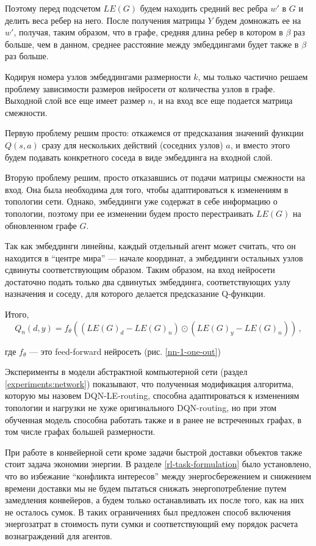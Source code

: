 \documentclass[specification,annotation,times]{itmo-student-thesis}
\theoremstyle{definition}
\begin{document}
Поэтому перед подсчетом $LE(G)$ будем находить
средний вес ребра $w'$ в $G$ и делить веса ребер на него. После получения
матрицы $Y$ будем домножать ее на $w'$, получая, таким образом, что в графе,
средняя длина ребер в котором в $\beta$ раз больше, чем в данном, среднее
расстояние между эмбеддингами будет также в $\beta$ раз больше.

Кодируя номера узлов эмбеддингами размерности $k$, мы только частично решаем
проблему зависимости размеров нейросети от количества узлов в графе. Выходной
слой все еще имеет размер $n$, и на вход все еще подается матрица смежности.

Первую проблему решим просто: откажемся от предсказания значений функции
$Q(s, a)$ сразу для нескольких действий (соседних узлов) $a$, и вместо этого
будем подавать конкретного соседа в виде эмбеддинга на входной слой.

Вторую проблему решим, просто отказавшись от подачи матрицы смежности на вход.
Она была необходима для того, чтобы адаптироваться к изменениям в топологии
сети. Однако, эмбеддинги уже содержат в себе информацию о топологии, поэтому при
ее изменении будем просто перестраивать $LE(G)$ на обновленном графе $G$.

Так как эмбеддинги линейны, каждый отдельный агент может считать, что он
находится в ``центре мира'' --- начале координат, а эмбеддинги остальных узлов
сдвинуты соответствующим образом. Таким образом, на вход нейросети достаточно
подать только два сдвинутых эмбеддинга, соответствующих узлу назначения и
соседу, для которого делается предсказание Q-функции.

Итого,
\begin{equation}
  Q_n(d, y) = f_{\theta}( (LE(G)_d - LE(G)_n) \odot (LE(G)_y - LE(G)_n)) \,,
\end{equation}

где $f_{\theta}$ --- это feed-forward нейросеть (рис. \ref{nn-1-one-out})

Эксперименты в модели абстрактной компьютерной сети (раздел
\ref{experiments:network}) показывают, что полученная модификация алгоритма,
которую мы назовем DQN-LE-routing, способна адаптироваться к изменениям
топологии и нагрузки не хуже оригинального DQN-routing, но при этом обученная
модель способна работать также и в ранее не встреченных графах, в том числе
графах большей размерности.

При работе в конвейерной сети кроме задачи быстрой доставки объектов также стоит
задача экономии энергии. В разделе \ref{rl-task-formulation} было установлено,
что во избежание ``конфликта интересов'' между энергосбережением и снижением
времени доставки мы не будем пытаться снижать энергопотребление путем замедления
конвейеров, а будем только останавливать их после того, как на них не осталось
сумок. В таких ограничениях был предложен способ включения энергозатрат в
стоимость пути сумки и соответствующий ему порядок расчета вознаграждений для
агентов.
\end{document}
